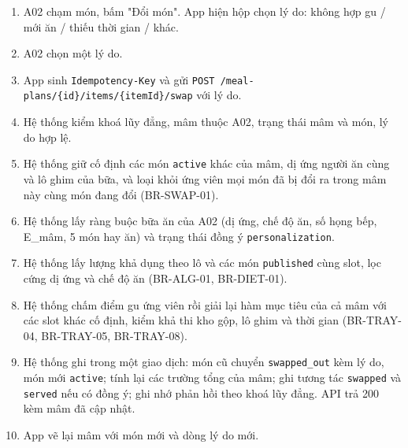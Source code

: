 \begin{enumerate}
\item A02 chạm món, bấm "Đổi món". App hiện hộp chọn lý do: không hợp gu /\allowbreak{} mới ăn /\allowbreak{} thiếu thời gian /\allowbreak{} khác.
\item A02 chọn một lý do.
\item App sinh {\small\texttt{Idempotency-\allowbreak{}Key}} và gửi {\small\texttt{POST /\allowbreak{}\allowbreak{}meal-\allowbreak{}plans/\allowbreak{}\allowbreak{}\{id\}/\allowbreak{}\allowbreak{}items/\allowbreak{}\allowbreak{}\{itemId\}/\allowbreak{}\allowbreak{}swap}} với lý do.
\item Hệ thống kiểm khoá lũy đẳng, mâm thuộc A02, trạng thái mâm và món, lý do hợp lệ.
\item Hệ thống giữ cố định các món {\small\texttt{active}} khác của mâm, dị ứng người ăn cùng và lô ghim của bữa, và loại khỏi ứng viên mọi món đã bị đổi ra trong mâm này cùng món đang đổi (BR-\allowbreak{}SWAP-\allowbreak{}01).
\item Hệ thống lấy ràng buộc bữa ăn của A02 (dị ứng, chế độ ăn, số họng bếp, E\_\allowbreak{}mâm, 5 món hay ăn) và trạng thái đồng ý {\small\texttt{personalization}}.
\item Hệ thống lấy lượng khả dụng theo lô và các món {\small\texttt{published}} cùng slot, lọc cứng dị ứng và chế độ ăn (BR-\allowbreak{}ALG-\allowbreak{}01, BR-\allowbreak{}DIET-\allowbreak{}01).
\item Hệ thống chấm điểm gu ứng viên rồi giải lại hàm mục tiêu của cả mâm với các slot khác cố định, kiểm khả thi kho gộp, lô ghim và thời gian (BR-\allowbreak{}TRAY-\allowbreak{}04, BR-\allowbreak{}TRAY-\allowbreak{}05, BR-\allowbreak{}TRAY-\allowbreak{}08).
\item Hệ thống ghi trong một giao dịch: món cũ chuyển {\small\texttt{swapped\_\allowbreak{}\allowbreak{}out}} kèm lý do, món mới {\small\texttt{active}}; tính lại các trường tổng của mâm; ghi tương tác {\small\texttt{swapped}} và {\small\texttt{served}} nếu có đồng ý; ghi nhớ phản hồi theo khoá lũy đẳng. API trả 200 kèm mâm đã cập nhật.
\item App vẽ lại mâm với món mới và dòng lý do mới.
\end{enumerate}
